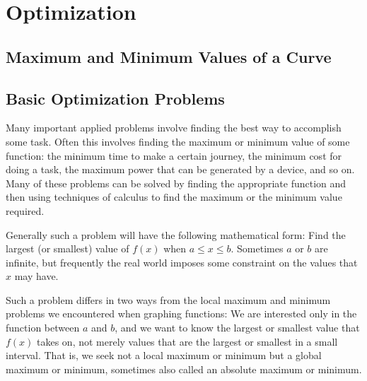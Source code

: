 \chapter{Optimization}

\section{Maximum and Minimum Values of a Curve}


\section{Basic Optimization Problems}



Many important applied problems involve finding the best way to
accomplish some task. Often this involves finding the maximum or
minimum value of some function: the minimum time to make a certain
journey, the minimum cost for doing a task, the maximum power that can
be generated by a device, and so on. Many of these problems can be
solved by finding the appropriate function and then using techniques
of calculus to find the maximum or the minimum value required.

Generally such a problem will have the following mathematical form:
Find the largest (or smallest) value of $f(x)$ when $a\le x\le
b$. Sometimes $a$ or $b$ are infinite, but frequently the real world
imposes some constraint on the values that $x$ may have.

Such a problem differs in two ways from the local maximum and minimum
problems we encountered when graphing functions: We are interested
only in the function between $a$ and $b$, and we want to know the
largest or smallest value that $f(x)$ takes on, not merely values that
are the largest or smallest in a small interval. That is, we seek not
a local maximum or minimum but a {\dfont global\/} maximum or minimum, sometimes also called an {\dfont
absolute\/} maximum or minimum.

